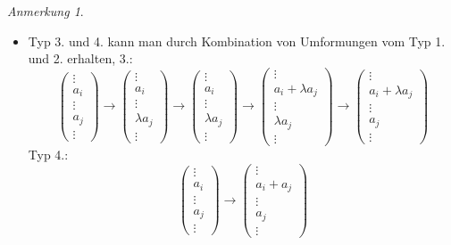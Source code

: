 \documentclass[a4paper]{scrartcl}
\theoremstyle{definition}
\theoremstyle{plain}
\theoremstyle{plain}
\theoremstyle{remark}
\theoremstyle{remark}
\newtheorem{note}{Anmerkung}
\theoremstyle{remark}
\theoremstyle{remark}
\theoremstyle{remark}
\begin{document}
\begin{note}
\mbox{}
\begin{itemize}
\item Typ 3. und 4. kann man durch Kombination von Umformungen vom Typ 1. und 2. erhalten, 3.:
\begin{equation}
\begin{pmatrix} \vdots \\ a_i \\ \vdots \\ a_j \\ \vdots\end{pmatrix}
\to \begin{pmatrix} \vdots \\ a_i \\ \vdots \\ \lambda a_j  \\ \vdots \end{pmatrix}
\to \begin{pmatrix} \vdots \\ a_i \\ \vdots \\ \lambda a_j \\ \vdots\end{pmatrix}
\to \begin{pmatrix} \vdots \\ a_i + \lambda a_j \\ \vdots \\ \lambda a_j  \\ \vdots \end{pmatrix}
\to \begin{pmatrix} \vdots \\ a_i + \lambda a_j \\ \vdots \\ a_j  \\ \vdots \end{pmatrix}
\end{equation}
Typ 4.:
\begin{equation}
\begin{pmatrix} \vdots \\ a_i \\ \vdots \\ a_j \\ \vdots\end{pmatrix}
\to \begin{pmatrix} \vdots \\ a_i + a_j \\ \vdots \\ a_j  \\ \vdots \end{pmatrix}

\end{equation}
\end{itemize}
\end{note}
\end{document}
